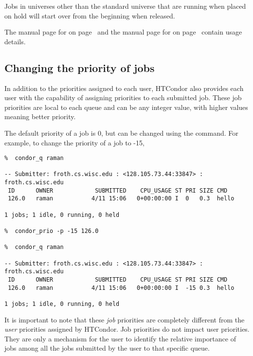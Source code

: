 Jobs in universes other than the standard universe that are running
when placed on hold will start over from the beginning when 
released.

The manual page for 
on page~\pageref{man-condor-hold}
and the manual page for 
on page~\pageref{man-condor-release}
contain usage details.

\subsection{\label{sec:job-prio}Changing the priority of jobs}

In addition to the priorities assigned to each user, HTCondor also provides
each user with the capability of assigning priorities to each submitted job.
These job priorities are local to each queue and can be any integer value, with
higher values meaning better priority.

The default priority of a job is 0, but can be changed using the 
command.
For example, to change the priority of a job to -15,
\footnotesize
\begin{verbatim}
%  condor_q raman

-- Submitter: froth.cs.wisc.edu : <128.105.73.44:33847> : froth.cs.wisc.edu
 ID      OWNER            SUBMITTED    CPU_USAGE ST PRI SIZE CMD               
 126.0   raman           4/11 15:06   0+00:00:00 I  0   0.3  hello             

1 jobs; 1 idle, 0 running, 0 held

%  condor_prio -p -15 126.0

%  condor_q raman

-- Submitter: froth.cs.wisc.edu : <128.105.73.44:33847> : froth.cs.wisc.edu
 ID      OWNER            SUBMITTED    CPU_USAGE ST PRI SIZE CMD               
 126.0   raman           4/11 15:06   0+00:00:00 I  -15 0.3  hello             

1 jobs; 1 idle, 0 running, 0 held
\end{verbatim}
\normalsize

It is important to note that these \emph{job} priorities are completely 
different from the \emph{user} priorities assigned by HTCondor.  Job priorities
do not impact user priorities.  They are only a mechanism for the user to
identify the relative importance of jobs among all the jobs submitted by the
user to that specific queue.

